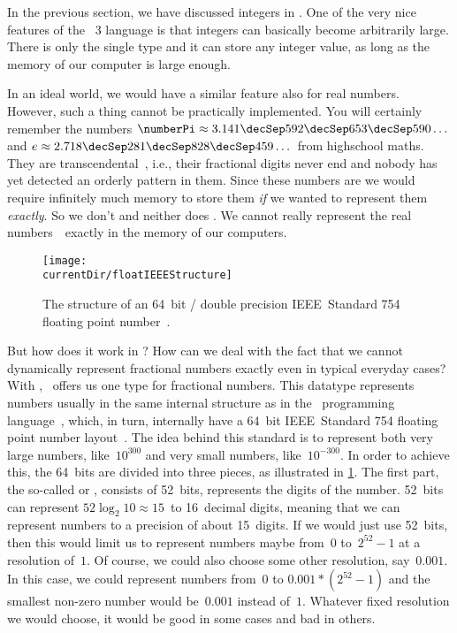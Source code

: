 %
\label{sec:float}%
\FloatBarrier%
%
In the previous section, we have discussed integers in \python.
One of the very nice features of the \python~3 language is that integers can basically become arbitrarily large.
There is only the single type  and it can store any integer value, as long as the memory of our computer is large enough.%
%
\begin{sloppypar}%
In an ideal world, we would have a similar feature also for real numbers.
However, such a thing cannot be practically implemented.
You will certainly remember the numbers $\numberPi\approx3.141\decSep592\decSep653\decSep590\dots$ and $e\approx2.718\decSep281\decSep828\decSep459\dots$ from highschool maths.
They are transcendental~\cite{N1939TTOP,APM1991AAAFI:TOEAP,F2011TTOEAP}, i.e., their fractional digits never end and nobody has yet detected an orderly pattern in them.
Since these numbers are  we would require infinitely much memory to store them \emph{if} we wanted to represent them \emph{exactly}.
So we don't and neither does \python.
We cannot really represent the real numbers~\realNumbers\ exactly in the memory of our computers.%
\end{sloppypar}%
%
%
\label{sec:howFloatingPointNumbersWork}%
%
\begin{figure}%
\centering%
\texttt{[image: \\currentDir/floatIEEEStructure]}%
\caption{The structure of an 64~bit / double precision IEEE~Standard 754 floating point number~\cite{IEEE2019ISFFPA,H1997IS7FPN}.}%
\label{fig:floatIEEEStructure}%
\end{figure}%
%
But how does it work in \python?
How can we deal with the fact that we cannot dynamically represent fractional numbers exactly even in typical everyday cases?
With , \python\ offers us one type for fractional numbers.
This datatype represents numbers usually in the same internal structure as  in the ~programming language~\cite{PSF:P3D:TPSL:NTIFC}, which, in turn, internally have a 64~bit IEEE~Standard 754 floating point number layout~\cite{IEEE2019ISFFPA,H1997IS7FPN}.
The idea behind this standard is to represent both very large numbers, like~$10^{300}$ and very small numbers, like~$10^{-300}$.
In order to achieve this, the 64~bits are divided into three pieces, as illustrated in \cref{fig:floatIEEEStructure}.
%
%
%
The first part, the so-called  or , consists of 52~bits, represents the digits of the number.
52~bits can represent $52\log_2 10\approx 15$~to 16~decimal digits, meaning that we can represent numbers to a precision of about 15~digits.
If we would just use 52~bits, then this would limit us to represent numbers maybe from~$0$ to~$2^{52}-1$ at a resolution of~$1$.
Of course, we could also choose some other resolution, say~$0.001$.
In this case, we could represent numbers from~$0$ to $0.001*(2^{52}-1)$ and the smallest non-zero number would be~$0.001$ instead of~$1$.
Whatever fixed resolution we would choose, it would be good in some cases and bad in others.

